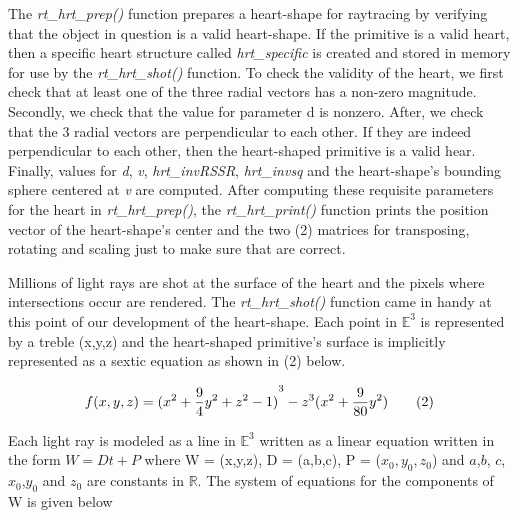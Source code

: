 \hspace{30} The   \textit{rt\_hrt\_prep()}   function   prepares   a   heart-­shape   for   ray­tracing   by  
verifying   that   the   object   in   question   is   a   valid   heart-­shape.   If   the   primitive   is   a  
valid   heart,   then   a   specific   heart   structure   called   \textit{hrt\_specific}   is   created   and  
stored   in   memory   for   use   by   the   \textit{rt\_hrt\_shot()}   function.   To   check   the   validity   of  
the   heart,   we   first   check   that   at least   one   of   the   three   radial   vectors   has   a  
non-zero   magnitude.   Secondly,   we   check   that   the   value   for   parameter   d   is  
non­zero.   After,   we   check   that   the   3   radial   vectors   are  
perpendicular   to   each other.   If   they   are   indeed   perpendicular   to   each   other,   then  
the   heart­-shaped   primitive   is   a   valid   hear.   Finally,  values   for   \textit{d},   \textit{v},  
\textit{hrt\_invRSSR},   \textit{hrt\_invsq}   and   the   heart-shape's   bounding   sphere   centered   at   \textit{v} are computed.   After  
computing   these   requisite   parameters   for   the   heart   in   \textit{rt\_hrt\_prep()},   the  
\textit{rt\_hrt\_print()}   function   prints   the   position   vector   of   the   heart-­shape's   center   and  
the   two   (2)   matrices   for   transposing,   rotating   and   scaling   just   to   make   sure   that  
are correct.

\hspace{30} Millions   of   light   rays   are   shot   at   the   surface   of   the   heart   and   the   pixels  
where   intersections   occur   are   rendered.   The   \textit{rt\_hrt\_shot()}   function   came   in  
handy   at   this   point   of   our   development   of   the   heart-­shape.   Each   point   in $ \mathbb{E}^3 $
   is   represented   by   a   treble   (x,y,z)   and   the heart-­shaped   primitive's   surface   is   implicitly   represented   as   a   sextic   equation as shown in (2) below.  

\begin{equation*}
\centering
  ­­­­­­­­­­­­­­f(x,y,z) = {(x^2 + \frac{9}{4}y^2 + z^2 - 1 )}^3 - z^3(x^2 + \frac{9}{80}y^2) \tag{2}
\end{equation*}

Each   light   ray   is   modeled   as   a   line   in   $ \mathbb{E}^3 $   written  
as   a   linear   equation   written   in   the   form   $W   =   Dt   +   P$   where   W   =   (x,y,z),   D   =   (a,b,c),  
P   =   ($x_0,y_0 ,z_0$) and $a$,$ b$, $ c$,$x_0$,$y_0$ and $z_0$ are constants in $ \mathbb{R} $.   The   system   of  
equations for the components of W is given below

